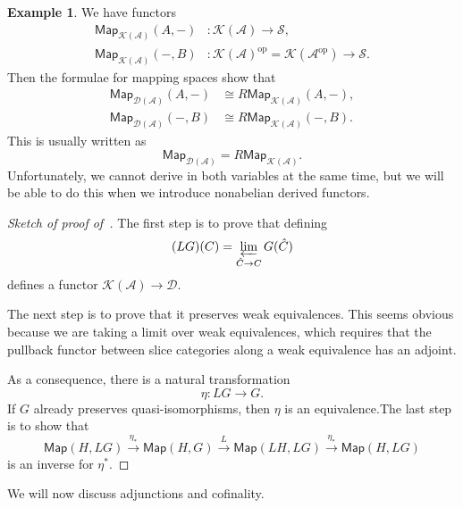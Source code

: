 \documentclass[10pt]{amsart}
\theoremstyle{definition}
\newtheorem{exm}[thm]{Example}
\theoremstyle{remark}
\theoremstyle{plain}
\theoremstyle{definition}
\theoremstyle{remark}
\newcommand{\mc}[1]{\mathcal{#1}}
\newcommand{\ms}[1]{\mathsf{#1}}
\newcommand{\1}{\mathbf{1}}
\newcommand{\2}{\mathbf{2}}
\newcommand{\3}{\mathbf{3}}
\DeclareMathOperator{\op}{op}
\begin{document}
\begin{exm}
    We have functors
    \begin{align*}
        \ms{Map}_{\mc{K}(\mc{A})}(A, -) &\colon \mc{K}(\mc{A}) \to \mc{S}, \\
        \ms{Map}_{\mc{K}(\mc{A})}(-, B) &\colon \mc{K}(\mc{A})^{\op} = \mc{K}(\mc{A}^{\op}) \to \mc{S}.
    \end{align*}
    Then the formulae for mapping spaces show that
    \begin{align*}
        \ms{Map}_{\mc{D}(\mc{A})}(A, -) &\cong R \ms{Map}_{\mc{K}(\mc{A})}(A, -), \\
        \ms{Map}_{\mc{D}(\mc{A})}(-, B) &\cong R \ms{Map}_{\mc{K}(\mc{A})}(-, B).
    \end{align*}
    This is usually written as
    \[ \ms{Map}_{\mc{D}(\mc{A})} = R\ms{Map}_{\mc{K}(\mc{A})}. \]
    Unfortunately, we cannot derive in both variables at the same time, but we will be able to do this when we introduce nonabelian derived functors.
\end{exm}

\begin{proof}[Sketch of proof of~]
    The first step is to prove that defining
    \[ (LG)(C) = \varprojlim_{\hat{C} \to C} G(\hat{C}) \]
    defines a functor $\mc{K}(\mc{A}) \to \mc{D}$.

    The next step is to prove that it preserves weak equivalences. This seems obvious because we are taking a limit over weak equivalences, which requires that the pullback functor between slice categories along a weak equivalence has an adjoint.

    As a consequence, there is a natural transformation
    \[ \eta \colon LG \to G. \]
    If $G$ already preserves quasi-isomorphisms, then $\eta$ is an equivalence.The last step is to show that
    \[ \ms{Map}(H, LG) \xrightarrow{\eta_*} \ms{Map}(H, G) \xrightarrow{L} \ms{Map}(LH, LG) \xrightarrow{\eta_*} \ms{Map}(H, LG) \]
    is an inverse for $\eta^*$.
\end{proof}

We will now discuss adjunctions and cofinality.
\end{document}
